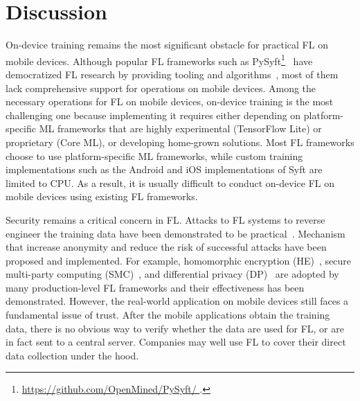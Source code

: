 \documentclass[conference]{IEEEtran}
\begin{document}

\section{Discussion}

\label{sec:discussion}


On-device training remains the most significant obstacle for
practical FL on mobile devices.
Although popular FL frameworks such as
PySyft\footnote{\url{
    https://github.com/OpenMined/PySyft/
}.}~\cite{ryffel2018generic,Ziller2021,hall2021syft}
have democratized FL research by providing tooling and
algorithms~\cite{sriraman2022device},
most of them lack comprehensive support for operations on mobile devices.
Among the necessary operations for FL on mobile devices,
on-device training is the most challenging one because
implementing it requires either depending on
platform-specific ML frameworks that are highly experimental (TensorFlow Lite)
or proprietary (Core ML),
or developing home-grown solutions.
Most FL frameworks choose to use platform-specific ML frameworks,
while custom training implementations such as
the Android and iOS implementations of Syft are limited to CPU.
As a result, it is usually difficult to conduct on-device FL
on mobile devices using existing FL frameworks.

Security remains a critical concern in FL.
Attacks to FL systems to reverse engineer the training data have been
demonstrated to be practical~\cite{sun2019really}.
Mechanism that increase anonymity and
reduce the risk of successful attacks have been proposed and implemented.
For example,
homomorphic encryption (HE)~\cite{wang2020homo},
secure multi-party computing (SMC)~\cite{bonawitz2016practical}, and
differential privacy
(DP)~\cite{dwork2006differential,geyer2017differentially} are
adopted by many production-level FL frameworks and
their effectiveness has been demonstrated.
However, the real-world application on mobile devices still faces a fundamental
issue of trust.
After the mobile applications obtain the training data,
there is no obvious way to verify whether the data are used for FL,
or are in fact sent to a central server.
Companies may well use FL to cover their direct data collection under the hood.

\printbibliography

\end{document}
